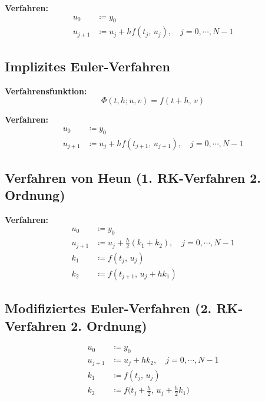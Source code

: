 \documentclass[a4paper, 11pt, accentcolor = tud3b]{tudreport}
\begin{document}
		        \noindent\textbf{Verfahren:}
	            \begin{align*}
	            	u_0     & \coloneqq y_0                                               \\
	            	u_{j+1} & \coloneqq u_j + h f(t_j,\, u_j), \quad j = 0, \cdots, N - 1
	            \end{align*}
	
	        \subsection{Implizites Euler-Verfahren}
		        \textbf{Verfahrensfunktion:}
		        \begin{equation*}
			        \Phi(t, h; u, v) = f(t + h,\, v)
		        \end{equation*}
	        
		        \noindent\textbf{Verfahren:}
	            \begin{align*}
	            	u_0     & \coloneqq y_0                                                       \\
	            	u_{j+1} & \coloneqq u_j + h f(t_{j+1},\, u_{j+1}), \quad j = 0, \cdots, N - 1
	            \end{align*}
	            
	
	        \subsection{Verfahren von Heun (1. RK-Verfahren 2. Ordnung)}
		        \noindent\textbf{Verfahren:}
	            \begin{align*}
	            	u_0     & \coloneqq y_0                                                       \\
	            	u_{j+1} & \coloneqq u_j + \frac{h}{2} (k_1 + k_2), \quad j = 0, \cdots, N - 1 \\
	            	k_1     & \coloneqq f(t_j,\, u_j)                                             \\
	            	k_2     & \coloneqq f(t_{j+1},\, u_j + hk_1)
	            \end{align*}
	
	        \subsection{Modifiziertes Euler-Verfahren (2. RK-Verfahren 2. Ordnung)}
	            \begin{align*}
	            	u_0     & \coloneqq y_0                                                   \\
	            	u_{j+1} & \coloneqq u_j + hk_2, \quad j = 0, \cdots, N - 1                \\
	            	k_1     & \coloneqq f(t_j,\, u_j)                                         \\
	            	k_2     & \coloneqq f\Big(t_j + \frac{h}{2},\, u_j + \frac{h}{2} k_1\Big)
	            \end{align*}
	
\end{document}

